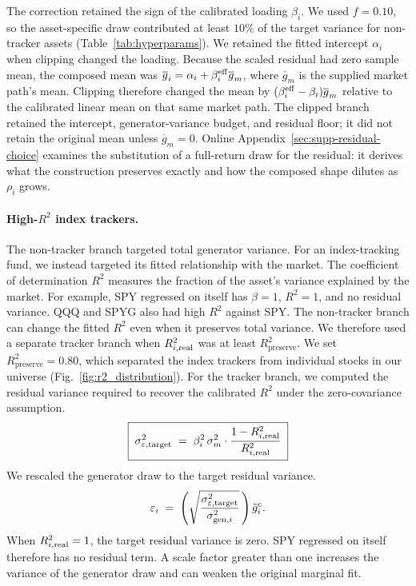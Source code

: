 The correction retained the sign of the calibrated loading $\beta_i$.
We used $f=0.10$, so the asset-specific draw contributed at least
$10\%$ of the target variance for non-tracker assets
(Table~\ref{tab:hyperparams}). We retained the fitted intercept
$\alpha_i$ when clipping changed the loading. Because the scaled
residual had zero sample mean, the composed mean was
$\overline{g}_i=\alpha_i+\beta_i^{\mathrm{eff}}\overline{g}_m$, where
$\overline{g}_m$ is the supplied market path's mean. Clipping therefore
changed the mean by $(\beta_i^{\mathrm{eff}}-\beta_i)\overline{g}_m$ relative
to the calibrated linear mean on that same market path. The clipped
branch retained the intercept, generator-variance budget, and residual
floor; it did not retain the original mean unless
$\overline{g}_m=0$. Online
Appendix~\ref{sec:supp-residual-choice} examines the substitution of
a full-return draw for the residual: it derives what the construction
preserves exactly and how the composed shape dilutes as $\rho_i$
grows.

\paragraph{High-$R^2$ index trackers.}

The non-tracker branch targeted total generator variance. For an
index-tracking fund, we instead targeted its fitted relationship with
the market. The coefficient of determination $R^2$ measures the
fraction of the asset's variance explained by the market. For example,
SPY regressed on itself has $\beta=1$, $R^2=1$, and no residual
variance. QQQ and SPYG also had high $R^2$ against SPY. The
non-tracker branch can change the fitted $R^2$ even when it preserves
total variance. We therefore used a separate tracker branch
when $R^2_{i,\mathrm{real}}$ was at least $R^2_{\mathrm{preserve}}$. We set
$R^2_{\mathrm{preserve}}=0.80$, which separated the index trackers from
individual stocks in our universe (Fig.~\ref{fig:r2_distribution}).
For the tracker branch, we computed the residual variance required to
recover the calibrated $R^2$ under the zero-covariance assumption.
\begin{equation}
  \boxed{\;\sigma_{\varepsilon,\mathrm{target}}^2 \;=\; \beta_i^2\, \sigma_m^2 \cdot
    \frac{1 - R^2_{i,\mathrm{real}}}{R^2_{i,\mathrm{real}}}\;}
  \label{eq:r2-target}
\end{equation}
We rescaled the generator draw to the target residual variance.
\begin{equation}
  \varepsilon_i \;=\; \left(\sqrt{\frac{\sigma_{\varepsilon,\mathrm{target}}^2}{\sigma_{\mathrm{gen},i}^2}}\,\right)\tilde{g}_i^{\mathrm c}.
  \label{eq:r2-rescale}
\end{equation}
When $R^2_{i,\mathrm{real}}=1$, the target residual variance is zero. SPY
regressed on itself therefore has no residual term. A scale factor
greater than one increases the variance of the generator draw and can
weaken the original marginal fit.


